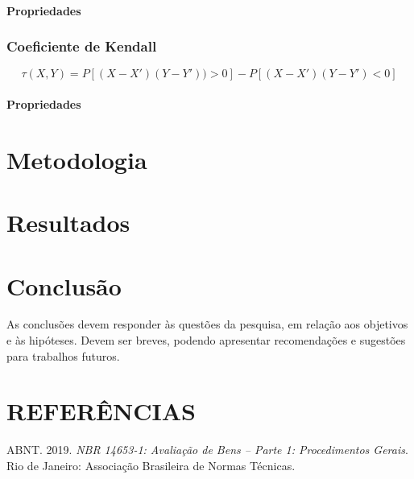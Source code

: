 \documentclass[
	12pt,				%
	oneside,			%
	a4paper,			%
	chapter=TITLE,		%
	section=TITLE,		%
	english,			%
	brazil				%
	]{abntex2}
\begin{document}
\hypertarget{propriedades-1}{%
\subsubsection{Propriedades}\label{propriedades-1}}

\hypertarget{coeficiente-de-kendall}{%
\subsection{Coeficiente de Kendall}\label{coeficiente-de-kendall}}

\[\tau(X, Y ) = P[(X - X')(Y - Y')) > 0] - P[(X - X')(Y - Y') < 0]\]

\hypertarget{propriedades-2}{%
\subsubsection{Propriedades}\label{propriedades-2}}

\hypertarget{metodologia}{%
\chapter{Metodologia}\label{metodologia}}

\hypertarget{resultados}{%
\chapter{Resultados}\label{resultados}}

\hypertarget{conclusao}{%
\chapter{Conclusão}\label{conclusao}}

As conclusões devem responder às questões da pesquisa, em relação aos objetivos
e às hipóteses. Devem ser breves, podendo apresentar recomendações e sugestões
para trabalhos futuros.

\hypertarget{referuxeancias}{%
\chapter*{REFERÊNCIAS}\label{referuxeancias}}


\hypertarget{refs}{}
\leavevmode\hypertarget{ref-NBR1465301}{}%
ABNT. 2019. \emph{NBR 14653-1: Avaliação de Bens -- Parte 1: Procedimentos Gerais}. Rio de Janeiro: Associação Brasileira de Normas Técnicas.
\end{document}
